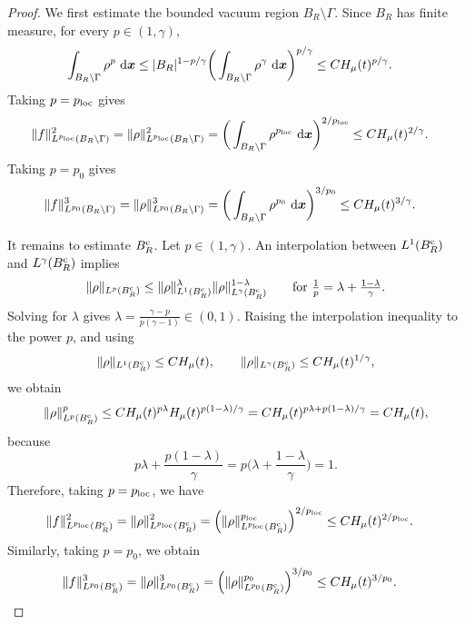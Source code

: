 \documentclass[reqno,11pt]{amsart}
\numberwithin{equation}{section}
\theoremstyle{definition}
\def\dd{{\, \rm d}}
\begin{document}
\begin{proof}
We first estimate the bounded vacuum region $B_R\setminus \Gamma$.  
Since $B_R$ has finite measure, for every $p\in(1,\gamma)$,
\[
\begin{aligned} \int_{B_R\setminus \Gamma}\rho^p\,\dd\boldsymbol{x} &\le  |B_R|^{1-p/\gamma} 
\bigg(\int_{B_R\setminus \Gamma}\rho^\gamma\,\dd\boldsymbol{x}\bigg)^{p/\gamma}\le  C H_\mu(t)^{p/\gamma}.
\end{aligned}
\]
Taking $p=p_{\rm loc}$ gives
\[
\begin{aligned}  \|f\|_{L^{p_{\rm loc}}(B_R\setminus \Gamma)}^2  =  \|\rho\|_{L^{p_{\rm loc}}(B_R\setminus \Gamma)}^2 &=
 \bigg(\int_{B_R\setminus \Gamma}\rho^{p_{\rm loc}} \,\dd\boldsymbol{x} \bigg)^{2/p_{\rm loc}}\le  C H_\mu(t)^{2/\gamma}.
\end{aligned}
\]
Taking $p=p_0$ gives
\[
\begin{aligned}
   \|f\|_{L^{p_0}(B_R\setminus \Gamma)}^3  = \|\rho\|_{L^{p_0}(B_R\setminus \Gamma)}^3  
   &=  \bigg(
 \int_{B_R\setminus \Gamma}\rho^{p_0} \,\dd\boldsymbol{x} \bigg)^{3/p_0} \le C H_\mu(t)^{3/\gamma}.
\end{aligned}
\]

It remains to estimate $B_R^{\rm c}$.  Let $p\in(1,\gamma)$. An interpolation
between $L^1(B_R^{\rm c})$ and $L^\gamma(B_R^{\rm c})$ implies
\[ \|\rho\|_{L^p(B_R^{\rm c})} \le
\|\rho\|_{L^1(B_R^{\rm c})}^\lambda
 \|\rho\|_{L^\gamma(B_R^{\rm c})}^{1-\lambda} 
 \qquad \mbox{for $\frac1p=\lambda+\frac{1-\lambda}{\gamma}$}.
\]
Solving for $\lambda$ gives
$\lambda=\frac{\gamma-p}{p(\gamma-1)}\in(0,1).$
Raising the interpolation inequality to the power $p$, and using
\[ \|\rho\|_{L^1(B_R^{\rm c})}
  \le C H_\mu(t), \qquad \|\rho\|_{L^\gamma(B_R^{\rm c})} \le C H_\mu(t)^{1/\gamma},
\]
we obtain 
\[
\begin{aligned}
 \|\rho\|_{L^p(B_R^{\rm c})}^p  \le
  C H_\mu(t)^{p\lambda} H_\mu(t)^{p(1-\lambda)/\gamma} =  C H_\mu(t)^{ p\lambda+p(1-\lambda)/\gamma} = C H_\mu(t),
\end{aligned}
\]
because
\[ p\lambda+\frac{p(1-\lambda)}{\gamma}
 =p\big(\lambda+\frac{1-\lambda}{\gamma}\big) 
 = 1.
\]
Therefore, taking $p=p_{\rm loc}$, we have
\[
\begin{aligned}
 \|f\|_{L^{p_{\rm loc}}(B_R^{\rm c})}^2
 = \|\rho\|_{L^{p_{\rm loc}}(B_R^{\rm c})}^2
&=\left(\|\rho\|_{L^{p_{\rm loc}}(B_R^{\rm c})}^{p_{\rm loc}} \right)^{2/p_{\rm loc}}\le C H_\mu(t)^{2/p_{\rm loc}}.
\end{aligned}
\]
Similarly, taking $p=p_0$, we obtain
\[
\begin{aligned}
\|f\|_{L^{p_0}(B_R^{\rm c})}^3 = \|\rho\|_{L^{p_0}(B_R^{\rm c})}^3
&= \left( \|\rho\|_{L^{p_0}(B_R^{\rm c})}^{p_0} \right)^{3/p_0}\le  C H_\mu(t)^{3/p_0}.
\end{aligned}
\]


\end{proof}
\end{document}
